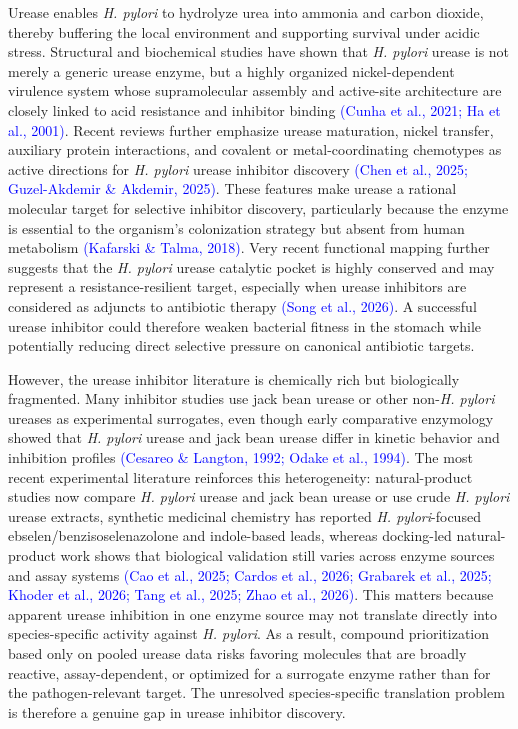 \documentclass[11pt]{article}
\begin{document}
Urease enables \textit{H. pylori} to hydrolyze urea into ammonia and carbon dioxide, thereby buffering the local environment and supporting survival under acidic stress. Structural and biochemical studies have shown that \textit{H. pylori} urease is not merely a generic urease enzyme, but a highly organized nickel-dependent virulence system whose supramolecular assembly and active-site architecture are closely linked to acid resistance and inhibitor binding \textcolor{blue}{(Cunha et al., 2021; Ha et al., 2001)}. Recent reviews further emphasize urease maturation, nickel transfer, auxiliary protein interactions, and covalent or metal-coordinating chemotypes as active directions for \textit{H. pylori} urease inhibitor discovery \textcolor{blue}{(Chen et al., 2025; Guzel-Akdemir \& Akdemir, 2025)}. These features make urease a rational molecular target for selective inhibitor discovery, particularly because the enzyme is essential to the organism's colonization strategy but absent from human metabolism \textcolor{blue}{(Kafarski \& Talma, 2018)}. Very recent functional mapping further suggests that the \textit{H. pylori} urease catalytic pocket is highly conserved and may represent a resistance-resilient target, especially when urease inhibitors are considered as adjuncts to antibiotic therapy \textcolor{blue}{(Song et al., 2026)}. A successful urease inhibitor could therefore weaken bacterial fitness in the stomach while potentially reducing direct selective pressure on canonical antibiotic targets.

However, the urease inhibitor literature is chemically rich but biologically fragmented. Many inhibitor studies use jack bean urease or other non-\textit{H. pylori} ureases as experimental surrogates, even though early comparative enzymology showed that \textit{H. pylori} urease and jack bean urease differ in kinetic behavior and inhibition profiles \textcolor{blue}{(Cesareo \& Langton, 1992; Odake et al., 1994)}. The most recent experimental literature reinforces this heterogeneity: natural-product studies now compare \textit{H. pylori} urease and jack bean urease or use crude \textit{H. pylori} urease extracts, synthetic medicinal chemistry has reported \textit{H. pylori}-focused ebselen/benzisoselenazolone and indole-based leads, whereas docking-led natural-product work shows that biological validation still varies across enzyme sources and assay systems \textcolor{blue}{(Cao et al., 2025; Cardos et al., 2026; Grabarek et al., 2025; Khoder et al., 2026; Tang et al., 2025; Zhao et al., 2026)}. This matters because apparent urease inhibition in one enzyme source may not translate directly into species-specific activity against \textit{H. pylori}. As a result, compound prioritization based only on pooled urease data risks favoring molecules that are broadly reactive, assay-dependent, or optimized for a surrogate enzyme rather than for the pathogen-relevant target. The unresolved species-specific translation problem is therefore a genuine gap in urease inhibitor discovery.
\end{document}
